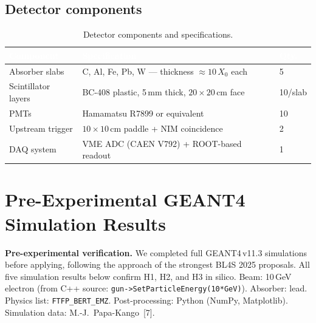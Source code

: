 \documentclass[11pt,a4paper]{article}
\begin{document}
\subsection{Detector components}

\begin{table}[!ht]
\centering
\caption{Detector components and specifications.}
\label{tab:detector}
\setlength{\tabcolsep}{8pt}
\renewcommand{\arraystretch}{1.3}
\begin{tabular}{L{3.4cm} L{6.0cm} C{1.6cm}}
\toprule
{}
\textcolor{white}{\textbf{Component}} &
\textcolor{white}{\textbf{Specification}} &
\textcolor{white}{\textbf{Qty.}} \\
\midrule
Absorber slabs      & C, Al, Fe, Pb, W --- thickness $\approx 10\,X_0$ each  & 5       \\
Scintillator layers & BC-408 plastic, 5\,mm thick, $20\times20$\,cm face     & 10/slab \\
PMTs                & Hamamatsu R7899 or equivalent                           & 10      \\
Upstream trigger    & $10\times10$\,cm paddle + NIM coincidence                & 2       \\
DAQ system          & VME ADC (CAEN V792) + ROOT-based readout                 & 1       \\
\bottomrule
\end{tabular}
\end{table}

\FloatBarrier

\section{Pre-Experimental GEANT4 Simulation Results}
\label{sec:sims}

\begin{simbox}
\textbf{Pre-experimental verification.}
We completed full GEANT4\,v11.3 simulations before applying, following
the approach of the strongest BL4S 2025 proposals.  All five simulation
results below confirm H1, H2, and H3 in silico.  Beam: 10\,GeV electron
(from C++ source: \texttt{gun->SetParticleEnergy(10*GeV)}).
Absorber: lead.  Physics list: \texttt{FTFP\_BERT\_EMZ}.
Post-processing: Python (NumPy, Matplotlib).
Simulation data: M.-J.\ Papa-Kango~[7].
\end{simbox}

\end{document}
